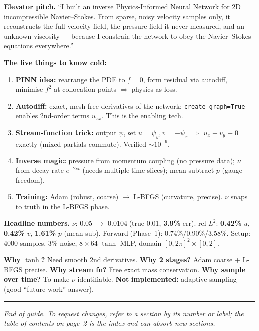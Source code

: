 \documentclass[11pt,a4paper]{article}
\begin{document}
\begin{mdframed}[linewidth=0.8pt, roundcorner=4pt, backgroundcolor=black!2]
\small
\textbf{Elevator pitch.} ``I built an inverse Physics-Informed Neural Network for
2D incompressible Navier--Stokes. From sparse, noisy velocity samples only, it
reconstructs the full velocity field, the pressure field it never measured, and
an unknown viscosity --- because I constrain the network to obey the
Navier--Stokes equations everywhere.''

\medskip
\textbf{The five things to know cold:}
\begin{enumerate}[leftmargin=1.6em, noitemsep]
  \item \textbf{PINN idea:} rearrange the PDE to $f=0$, form residual via
    autodiff, minimise $f^2$ at collocation points $\Rightarrow$ physics as loss.
  \item \textbf{Autodiff:} exact, mesh-free derivatives of the network;
    \texttt{create\_graph=True} enables 2nd-order terms $u_{xx}$. This is the
    enabling tech.
  \item \textbf{Stream-function trick:} output $\psi$, set $u=\psi_y,v=-\psi_x$
    $\Rightarrow$ $u_x+v_y\equiv0$ exactly (mixed partials commute). Verified
    $\sim 10^{-9}$.
  \item \textbf{Inverse magic:} pressure from momentum coupling (no pressure
    data); $\nu$ from decay rate $e^{-2\nu t}$ (needs multiple time slices);
    mean-subtract $p$ (gauge freedom).
  \item \textbf{Training:} Adam (robust, coarse) $\to$ L-BFGS (curvature,
    precise). $\nu$ snaps to truth in the L-BFGS phase.
\end{enumerate}

\medskip
\textbf{Headline numbers.} $\nu$: 0.05 $\to$ 0.0104 (true 0.01, \textbf{3.9\%}
err). rel-$L^2$: \textbf{0.42\%} $u$, \textbf{0.42\%} $v$, \textbf{1.61\%} $p$
(mean-sub). Forward (Phase~1): 0.74\%/0.90\%/3.58\%. Setup: 4000 samples, 3\%
noise, $8\times64$ $\tanh$ MLP, domain $[0,2\pi]^2\times[0,2]$.

\medskip
\textbf{Why $\tanh$?} Need smooth 2nd derivatives. \textbf{Why 2 stages?} Adam
coarse + L-BFGS precise. \textbf{Why stream fn?} Free exact mass conservation.
\textbf{Why sample over time?} To make $\nu$ identifiable. \textbf{Not
implemented:} adaptive sampling (good ``future work'' answer).
\end{mdframed}

\vfill
\begin{center}\rule{0.4\textwidth}{0.4pt}\end{center}
\begin{center}\small\itshape
End of guide. To request changes, refer to a section by its number or label;
the table of contents on page~2 is the index and can absorb new sections.
\end{center}
\end{document}
